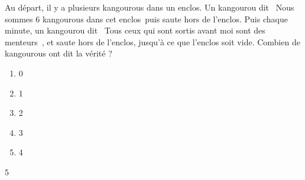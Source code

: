 Au départ, il y a plusieurs kangourous dans un enclos.
Un kangourou dit \og\ Nous sommes 6 kangourous dans cet enclos\fg\ puis saute hors de l'enclos. Puis chaque minute, un kangourou dit \og\ Tous ceux qui sont sortis avant moi sont des menteurs\fg\ , et saute hors de l'enclos, jusqu'à ce que l'enclos soit vide. Combien de kangourous ont dit la vérité ?
\begin{multicols}{5}
  \begin{enumerate}[A/]
  \item 0
  \item 1
  \item 2
  \item 3
  \item 4
  \end{enumerate}
\end{multicols}{5}